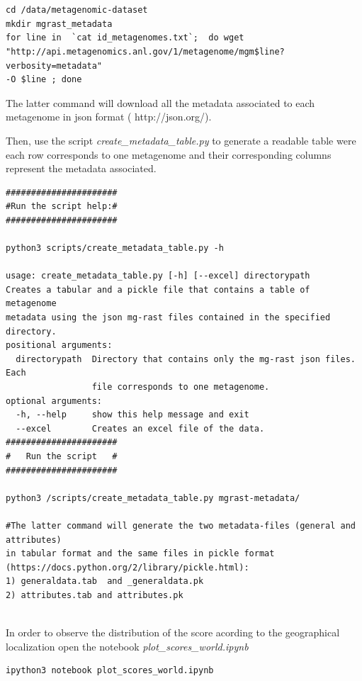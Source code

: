 \documentclass[12pt]{report}
\begin{document}
\begin{verbatim}


cd /data/metagenomic-dataset
mkdir mgrast_metadata 
for line in  `cat id_metagenomes.txt`;  do wget 
"http://api.metagenomics.anl.gov/1/metagenome/mgm$line?verbosity=metadata" 
-O $line ; done 
\end{verbatim}
The latter command will download all the metadata associated to each metagenome
in json format ( http://json.org/).

Then, use the script \textit{create\_metadata\_table.py} to generate a readable
table were each row corresponds to one metagenome and their corresponding
columns represent the metadata associated. 
 
\begin{verbatim}
######################
#Run the script help:#
######################

python3 scripts/create_metadata_table.py -h

usage: create_metadata_table.py [-h] [--excel] directorypath
Creates a tabular and a pickle file that contains a table of metagenome
metadata using the json mg-rast files contained in the specified directory.
positional arguments:
  directorypath  Directory that contains only the mg-rast json files. Each
                 file corresponds to one metagenome.
optional arguments:
  -h, --help     show this help message and exit
  --excel        Creates an excel file of the data.
######################
#   Run the script   #
######################

python3 /scripts/create_metadata_table.py mgrast-metadata/ 

#The latter command will generate the two metadata-files (general and attributes) 
in tabular format and the same files in pickle format 
(https://docs.python.org/2/library/pickle.html):
1) generaldata.tab  and _generaldata.pk
2) attributes.tab and attributes.pk   
 
\end{verbatim}

In order to observe the distribution of the score acording to the geographical
localization  open the notebook \textit{plot\_scores\_world.ipynb} 
\begin{verbatim}
ipython3 notebook plot_scores_world.ipynb
\end{verbatim}
\end{document}
